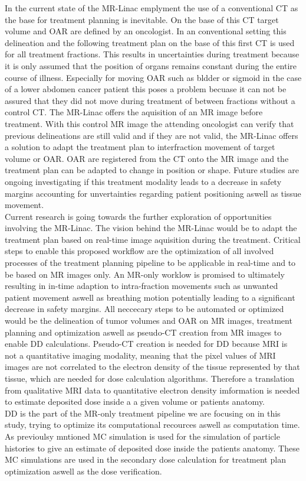 In the current state of the MR-Linac emplyment the use of a conventional \ac{CT} as the base for treatment planning is inevitable.
On the base of this \acs{CT} target volume and \ac{OAR} are defined by an oncologist.
In an conventional setting this delineation and the following treatment plan on the base of this first \ac{CT} is used for all treatment fractions.
This results in uncertainties during treatment because it is only assumed that the position of organs remains constant during the entire course of illness.
Especially for moving \acs{OAR} such as bldder or sigmoid in the case of a lower abdomen cancer patient this poses a problem becuase it can not be assured that they did not move during treatment of between fractions without a control \acs{CT}.
The MR-Linac offers the aquisition of an MR image before treatment.
With this control MR image the attending oncologist can verify that previous delineations are still valid and if they are not valid, the MR-Linac offers a solution to adapt the treatment plan to interfraction movement of target volume or \acs{OAR}.
\acs{OAR} are registered from the CT onto the MR image and the treatment plan can be adapted to change in position or shape.
Future studies are ongoing investigating if this treatment modality leads to a decrease in safety margins accounting for unvertainties regarding patient positioning aswell as tissue movement.\\
Current research is going towards the further exploration of opportunities involving the MR-Linac.
The vision behind the MR-Linac would be to adapt the treatment plan based on real-time image aquisition during the treatment.
Critical steps to enable this proposed workflow are the optimization of all involved processes of the treatment planning pipeline to be applicable in real-time and to be based on MR images only.
An MR-only worklow is promised to ultimately resulting in in-time adaption to intra-fraction movements such as unwanted patient movement aswell as breathing motion potentially leading to a significant decrease in safety margins.
All neccecary steps to be automated or optimized would be the delineation of tumor volumes and \acs{OAR} on MR images, treatment planning and optimization aswell as pseudo-CT creation from MR images to enable \acs{DD} calculations.
Pseudo-CT creation is needed for \acs{DD} because \acs{MRI} is not a quantitative imaging modality, meaning that the pixel values of \acs{MRI} images are not correlated to the electron density of the tissue represented by that tissue, which are needed for dose calculation algorithms.
Therefore a translation from qualitative MRI data to quantitative electron density imformation is needed to estimate deposited dose inside a a given volume or patients anatomy.\\
\acs{DD} is the part of the MR-only treatment pipeline we are focusing on in this study, trying to optimize its computational recources aswell as computation time. 
As previoulsy mntioned \acs{MC} simulation is used for the simulation of particle histories to give an estimate of deposited dose inside the patients anatomy.
These \acs{MC} simulations are used in the secondary dose calculation for treatment plan optimization aswell as the dose verification.


